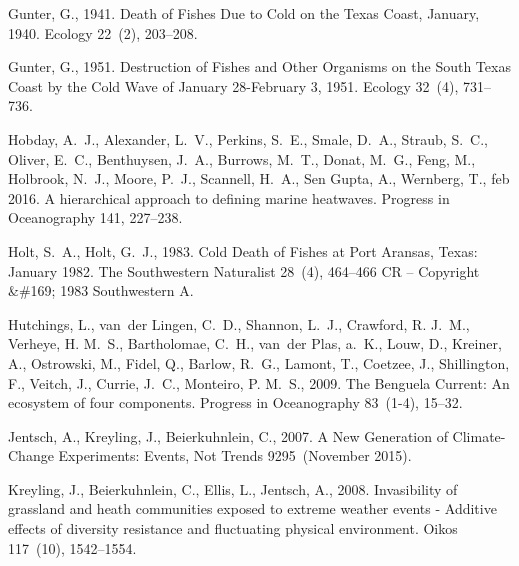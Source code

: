 \documentclass[a4paper,10pt,review]{elsarticle}
\begin{document}
\begin{thebibliography}{52}
Gunter, G., 1941. {Death of Fishes Due to Cold on the Texas Coast, January,
  1940}. Ecology 22~(2), 203--208.

Gunter, G., 1951. {Destruction of Fishes and Other Organisms on the South Texas
  Coast by the Cold Wave of January 28-February 3, 1951}. Ecology 32~(4),
  731--736.

Hobday, A.~J., Alexander, L.~V., Perkins, S.~E., Smale, D.~A., Straub, S.~C.,
  Oliver, E.~C., Benthuysen, J.~A., Burrows, M.~T., Donat, M.~G., Feng, M.,
  Holbrook, N.~J., Moore, P.~J., Scannell, H.~A., {Sen Gupta}, A., Wernberg,
  T., feb 2016. {A hierarchical approach to defining marine heatwaves}.
  Progress in Oceanography 141, 227--238.

Holt, S.~A., Holt, G.~J., 1983. {Cold Death of Fishes at Port Aransas, Texas:
  January 1982}. The Southwestern Naturalist 28~(4), 464--466 CR -- Copyright
  {\&}{\#}169; 1983 Southwestern A.

Hutchings, L., van~der Lingen, C.~D., Shannon, L.~J., Crawford, R. J.~M.,
  Verheye, H. M.~S., Bartholomae, C.~H., van~der Plas, a.~K., Louw, D.,
  Kreiner, A., Ostrowski, M., Fidel, Q., Barlow, R.~G., Lamont, T., Coetzee,
  J., Shillington, F., Veitch, J., Currie, J.~C., Monteiro, P. M.~S., 2009.
  {The Benguela Current: An ecosystem of four components}. Progress in
  Oceanography 83~(1-4), 15--32.

Jentsch, A., Kreyling, J., Beierkuhnlein, C., 2007. {A New Generation of
  Climate-Change Experiments: Events, Not Trends} 9295~(November 2015).

Kreyling, J., Beierkuhnlein, C., Ellis, L., Jentsch, A., 2008. {Invasibility of
  grassland and heath communities exposed to extreme weather events - Additive
  effects of diversity resistance and fluctuating physical environment}. Oikos
  117~(10), 1542--1554.


\end{thebibliography}
\end{document}

